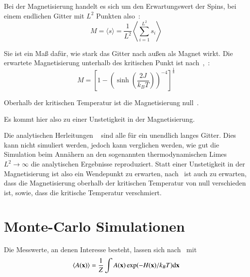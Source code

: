 	
	Bei der Magnetisierung handelt es sich um den Erwartungswert der Spins, bei einem endlichen Gitter mit $L^2$ Punkten also~\cite[vgl. ][S. 8]{binderheermann}:
	\begin{equation}
	M=\langle s \rangle=\frac{1}{L^2}\left\langle  \sum_{i=1}^{L^2} s_i \right\rangle
	\label{eq:magnetisierung}
	\end{equation}

	
	Sie ist ein Maß dafür, wie stark das Gitter nach außen als Magnet wirkt. Die erwartete Magnetisierung unterhalb des kritischen Punkt ist nach~\cite{YangMagnetization},~\cite{MontrollMagnetization}:
	\begin{equation} M=\left[1-\left(\sinh\left(\frac{2J}{k_BT}\right)\right)^{-4}\right]^{\frac{1}{8}}
	\label{eq:magnetisierungsgleichungliteratur}
	\end{equation}
	
	Oberhalb der kritischen Temperatur ist die Magnetisierung null~\cite[Gl. 81]{MontrollMagnetization}.
	
	Es kommt hier also zu einer Unstetigkeit in der Magnetisierung.
	
	Die analytischen Herleitungen ~\cite{OnsagerCrystal1,YangMagnetization,MontrollMagnetization} sind alle für ein unendlich langes Gitter. Dies kann nicht simuliert werden, jedoch kann verglichen werden, wie gut die Simulation beim Annähern an den sogenannten thermodynamischen Limes $L^2\to\infty$ die analytischen Ergebnisse reproduziert.
	Statt einer Unstetigkeit in der Magnetisierung ist also ein Wendepunkt zu erwarten, nach~\cite[S. 45ff., S.101f.]{binderheermann} ist auch zu erwarten, dass die Magnetisierung oberhalb der kritischen Temperatur von null verschieden ist, sowie, dass die kritische Temperatur verschmiert.
	
	
	\section{Monte-Carlo Simulationen}
	\label{sec:mctheorie}
	Die Messwerte, an denen Interesse besteht, lassen sich nach~\cite[S. 8]{binderheermann}  mit \[
	\langle A(\mathbf{x}) \rangle=\frac{1}{Z}\int A(\mathbf{x}) \exp(-H(\mathbf{x})/k_BT)\text{d} \mathbf{x}\]
	
